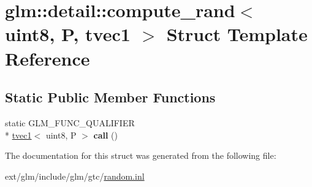 \hypertarget{structglm_1_1detail_1_1compute__rand_3_01uint8_00_01_p_00_01tvec1_01_4}{\section{glm\-:\-:detail\-:\-:compute\-\_\-rand$<$ uint8, P, tvec1 $>$ Struct Template Reference}
\label{structglm_1_1detail_1_1compute__rand_3_01uint8_00_01_p_00_01tvec1_01_4}
}
\subsection*{Static Public Member Functions}
\begin{DoxyCompactItemize}
\item 
\hypertarget{structglm_1_1detail_1_1compute__rand_3_01uint8_00_01_p_00_01tvec1_01_4_abdfb11bac3bebc1ea1a6a77445291fd0}{static G\-L\-M\-\_\-\-F\-U\-N\-C\-\_\-\-Q\-U\-A\-L\-I\-F\-I\-E\-R \\*
\hyperlink{structglm_1_1tvec1}{tvec1}$<$ uint8, P $>$ {\bfseries call} ()}\label{structglm_1_1detail_1_1compute__rand_3_01uint8_00_01_p_00_01tvec1_01_4_abdfb11bac3bebc1ea1a6a77445291fd0}

\end{DoxyCompactItemize}


The documentation for this struct was generated from the following file\-:\begin{DoxyCompactItemize}
\item 
ext/glm/include/glm/gtc/\hyperlink{random_8inl}{random.\-inl}\end{DoxyCompactItemize}
